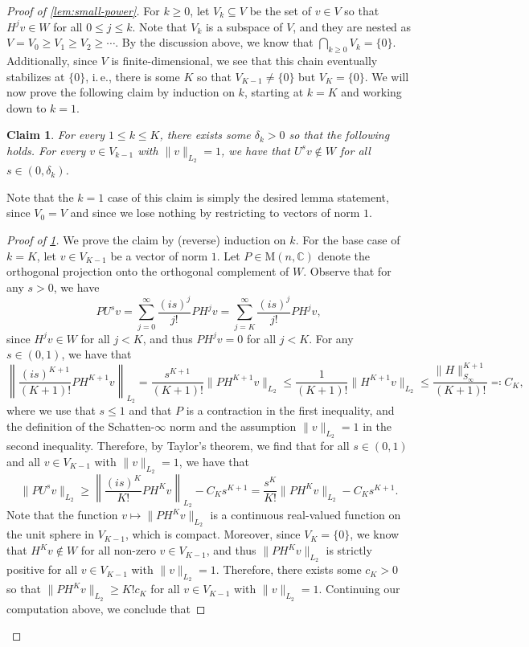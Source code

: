 \documentclass[11pt]{article}
\newtheorem{claim}[theorem]{Claim}
\newcommand{\ie}{i.\,e.}
\theoremstyle{plain}
\numberwithin{equation}{section}
\theoremstyle{definition}
\newcommand{\bC}{\mathbb{C}}
\newcommand{\bnorm}[1]{\left\lVert#1\right\rVert}
\newcommand{\norm}[1]{\lVert#1\rVert}
\newcommand{\M}{\mathrm{M}}
\begin{document}
\begin{proof}[Proof of \cref{lem:small-power}]
    For $k \geq 0$, let $V_k \subseteq V$ be the set of $v \in V$ so that $H^j v \in W$ for all $0 \leq j \leq k$. Note that $V_k$ is a subspace of $V$, and they are nested as $V=V_0 \geq V_1 \geq V_2 \geq \dotsb$. By the discussion above, we know that $\bigcap_{k \geq 0} V_k = \{0\}$. Additionally, since $V$ is finite-dimensional, we see that this chain eventually stabilizes at $\{0\}$, \ie, there is some $K$ so that $V_{K-1} \neq \{0\}$ but $V_{K}=\{0\}$. We will now prove the following claim by induction on $k$, starting at $k=K$ and working down to $k=1$.
    \begin{claim}\label{claim:induction}
        For every $1 \leq k \leq K$, there exists some $\delta_k>0$ so that the following holds. For every $v \in V_{k-1}$ with $\norm{v}_{L_2}=1$, we have that $U^s v \notin W$ for all $s \in (0,\delta_k)$.
    \end{claim}
    Note that the $k=1$ case of this claim is simply the desired lemma statement, since $V_0=V$ and since we lose nothing by restricting to vectors of norm $1$.
    \begin{proof}[Proof of \cref{claim:induction}]
        We prove the claim by (reverse) induction on $k$. For the base case of $k=K$, let $v \in V_{K-1}$ be a vector of norm $1$. Let $P\in\M(n,\bC)$ denote the orthogonal projection onto the orthogonal complement of $W$. Observe that for any $s>0$, we have
        \[
            P U^s v = \sum_{j=0}^\infty \frac{(is)^j}{j!} PH^j v = \sum_{j=K}^\infty \frac{(is)^j}{j!} PH^j v,
        \]
        since $H^jv \in W$ for all $j<K$, and thus $PH^j v =0$ for all $j <K$. For any $s \in (0,1)$, we have that
        \[
            \bnorm{\frac{(is)^{K+1}}{(K+1)!} PH^{K+1}v}_{L_2} = \frac{s^{K+1}}{(K+1)!} \norm{PH^{K+1}v}_{L_2} \leq \frac{1}{(K+1)!} \norm{H^{K+1}v}_{L_2} \leq \frac{\norm H_{S_{\infty}}^{K+1}}{(K+1)!}\eqqcolon C_K,
        \]
        where we use that $s \leq 1$ and that $P$ is a contraction in the first inequality, and the definition of the Schatten-$\infty$ norm and the assumption $\norm{v}_{L_2}=1$ in the second inequality. Therefore, by Taylor's theorem, we find that for all $s \in (0,1)$ and all $v \in V_{K-1}$ with $\norm{v}_{L_2}=1$, we have that
        \[
            \norm{PU^s v}_{L_2} \geq \bnorm{\frac{(is)^K}{K!} PH^K v}_{L_2} - C_K s^{K+1} = \frac{s^K}{K!} \norm{PH^K v}_{L_2} - C_K s^{K+1}.
        \]
        Note that the function $v \mapsto \norm{PH^K v}_{L_2}$ is a continuous real-valued function on the unit sphere in $V_{K-1}$, which is compact. Moreover, since $V_K=\{0\}$, we know that $H^K v \notin W$ for all non-zero $v \in V_{K-1}$, and thus $\norm{PH^K v}_{L_2}$ is strictly positive for all $v \in V_{K-1}$ with $\norm v_{L_2}=1$. Therefore, there exists some $c_K>0$ so that $\norm{PH^K v}_{L_2} \geq K! c_K$ for all $v \in V_{K-1}$ with $\norm v_{L_2}=1$. Continuing our computation above, we conclude that


\end{proof}
\end{proof}
\end{document}
